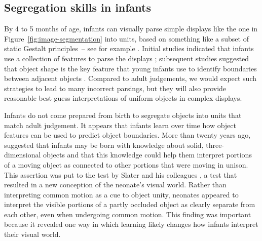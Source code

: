 


\subsection{Segregation skills in infants}

\label{sect:infant-skills}


%
By 4 to 5 months of age, infants can
visually parse simple displays like the one in 
Figure~\ref{fig:image-segmentation}
 into units, based on something like 
a subset of static
Gestalt principles~--
 see for example .
%
%
%
Initial studies indicated that infants use a collection of
features to parse the displays \cite{needham98infants,needham97object,needham98effects}; subsequent studies suggested that object shape is the key
feature that young infants use to identify boundaries between adjacent
objects \cite{needham99role}.
%
%
Compared to adult judgements,
%
we would expect such strategies to lead to many incorrect parsings, 
but they will
also provide reasonable best guess interpretations of uniform objects
in complex displays.  



Infants do not come prepared from birth to segregate objects into 
units that match adult judgement.
%
%
It appears that infants learn over time how object
features can be used to predict object boundaries.  More than twenty
years ago,  suggested that infants may be born
with knowledge about solid, three-dimensional objects and that this
knowledge could help them interpret portions of a moving object as
connected to other portions that were moving in unison.  This
assertion was put to the test by Slater and his colleagues 
\cite{slater90newborn}, a test that resulted in a new conception of
the neonate's visual world.  Rather than interpreting common motion as
a cue to object unity, neonates appeared to interpret the visible portions of a
partly occluded object as clearly separate from each other, even when
undergoing common motion.  This finding was important because it
revealed one way in which learning likely changes how infants
interpret their visual world.


